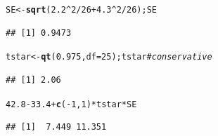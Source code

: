 \documentclass[twoside]{book}\usepackage[]{graphicx}\usepackage[]{xcolor}
\makeatletter
\newcommand{\hlnum}[1]{\textcolor[rgb]{0.686,0.059,0.569}{#1}}%
\newcommand{\hlcom}[1]{\textcolor[rgb]{0.678,0.584,0.686}{\textit{#1}}}%
\newcommand{\hlopt}[1]{\textcolor[rgb]{0,0,0}{#1}}%
\newcommand{\hlstd}[1]{\textcolor[rgb]{0.345,0.345,0.345}{#1}}%
\newcommand{\hlkwb}[1]{\textcolor[rgb]{0.69,0.353,0.396}{#1}}%
\newcommand{\hlkwc}[1]{\textcolor[rgb]{0.333,0.667,0.333}{#1}}%
\newcommand{\hlkwd}[1]{\textcolor[rgb]{0.737,0.353,0.396}{\textbf{#1}}}%
\newenvironment{kframe}{%
 \def\at@end@of@kframe{}%
 \ifinner\ifhmode%
  \def\at@end@of@kframe{\end{minipage}}%
  \begin{minipage}{\columnwidth}%
 \fi\fi%
 \def\FrameCommand##1{\hskip\@totalleftmargin \hskip-\fboxsep
 \colorbox{shadecolor}{##1}\hskip-\fboxsep
     \hskip-\linewidth \hskip-\@totalleftmargin \hskip\columnwidth}%
 \MakeFramed {\advance\hsize-\width
   \@totalleftmargin\z@ \linewidth\hsize
   \@setminipage}}%
 {\par\unskip\endMakeFramed%
 \at@end@of@kframe}
\newenvironment{knitrout}{}{} %
\makeatother
\begin{document}
\begin{solution}
\begin{knitrout}
\color{fgcolor}\begin{kframe}
\begin{alltt}
\hlstd{SE} \hlkwb{<-} \hlkwd{sqrt}\hlstd{(} \hlnum{2.2}\hlopt{^}\hlnum{2} \hlopt{/} \hlnum{26} \hlopt{+} \hlnum{4.3}\hlopt{^}\hlnum{2} \hlopt{/} \hlnum{26}\hlstd{); SE}
\end{alltt}
\begin{verbatim}
## [1] 0.9473
\end{verbatim}
\begin{alltt}
\hlstd{tstar} \hlkwb{<-} \hlkwd{qt}\hlstd{(}\hlnum{0.975}\hlstd{,} \hlkwc{df} \hlstd{=} \hlnum{25}\hlstd{); tstar}   \hlcom{# conservative}
\end{alltt}
\begin{verbatim}
## [1] 2.06
\end{verbatim}
\begin{alltt}
\hlnum{42.8} \hlopt{-} \hlnum{33.4} \hlopt{+} \hlkwd{c}\hlstd{(}\hlopt{-}\hlnum{1}\hlstd{,}\hlnum{1}\hlstd{)} \hlopt{*} \hlstd{tstar} \hlopt{*} \hlstd{SE}
\end{alltt}
\begin{verbatim}
## [1]  7.449 11.351
\end{verbatim}
\end{kframe}
\end{knitrout}
\end{solution}
\end{document}
